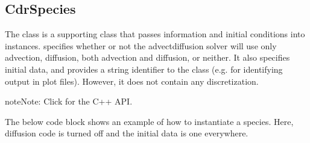 \documentclass[letterpaper,10pt,english]{sphinxmanual}
\begin{document}
\subsection{CdrSpecies}
\label{\detokenize{Solvers/CDR:cdrspecies}}\label{\detokenize{Solvers/CDR:chap-cdrspecies}}
The  class is a supporting class that passes information and initial conditions into  instances.
 specifies whether or not the advect\sphinxhyphen{}diffusion solver will use only advection, diffusion, both advection and diffusion, or neither.
It also specifies initial data, and provides a string identifier to the class (e.g. for identifying output in plot files).
However, it does not contain any discretization.

\begin{sphinxadmonition}{note}{Note:}
Click  for the  C++ API.
\end{sphinxadmonition}

The below code block shows an example of how to instantiate a species.
Here, diffusion code is turned off and the initial data is one everywhere.

\begin{sphinxVerbatim}[commandchars=\\\{\},formatcom=\scriptsize]
    

           
        
             

     

            
       
\end{sphinxVerbatim}
\end{document}
